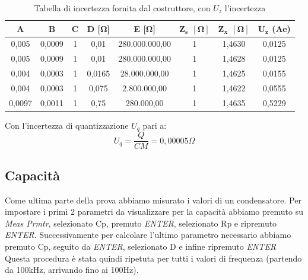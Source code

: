 \begin{table}[!ht]
\centering
\begin{tabular}{|c|c|c|c|c|c|c|c|}
\hline
\textbf{A}      & \textbf{B}      & \textbf{C} & \textbf{D [$\bm{\Omega}$]} & \textbf{E [$\bm{\Omega}$]}  & $\bm{Z_s \ \ [\Omega]}$ & $\bm{Z_x \ \ [\Omega]}$ & $\bm{U_z}$ \textbf{(Ae)} \\ \hline
0,005  & 0,0009 & 1 & 0,01      & 280.000.000,00  & 1          & 1,4630     & 0,0125  \\ \hline
0,005  & 0,0009 & 1 & 0,01      & 280.000.000,00  & 1          & 1,4628     & 0,0125  \\ \hline
0,004  & 0,0003 & 1 & 0,0165    & 28.000.000,00  & 1          & 1,4625     & 0,0155  \\ \hline
0,004  & 0,0003 & 1 & 0,075     & 2.800.000,00  & 1          & 1,4622     & 0,0555  \\ \hline
0,0097 & 0,0011 & 1 & 0,75      & 280.000,00  & 1          & 1,4635     & 0,5229  \\ \hline
\end{tabular}
\caption{Tabella di incertezza fornita dal costruttore, con $U_z$ l'incertezza}
\label{tab:lcr_z_sheet}
\end{table}
\FloatBarrier

Con l'incertezza di quantizzazione $U_q$ pari a:
\begin{equation}
    U_q = \frac{Q}{CM} = 0,00005 \Omega
\end{equation}
\clearpage


\subsection{Capacità}
\label{sub:c}
Come ultima parte della prova abbiamo misurato i valori di un condensatore.
Per impostare i primi 2 parametri da visualizzare per la capacità abbiamo premuto su \emph{Meas Prmtr}, selezionato Cp, premuto \emph{ENTER}, selezionato Rp e ripremuto \emph{ENTER}. Successivamente per calcolare l'ultimo parametro necessario abbiamo premuto Cp, seguito da \emph{ENTER}, selezionato D e infine ripremuto \emph{ENTER}
Questa procedura è stata quindi ripetuta per tutti i valori di frequenza (partendo da 100kHz, arrivando fino ai 100Hz).


